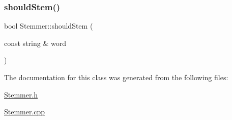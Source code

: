 \mbox{\label{class_stemmer_a7f617d3eda7515b21e88a7d585da0713}} 
\subsubsection{\texorpdfstring{should\+Stem()}{shouldStem()}}
{\footnotesize\ttfamily bool Stemmer\+::should\+Stem (\begin{DoxyParamCaption}\item[{const string \&}]{word }\end{DoxyParamCaption})}



The documentation for this class was generated from the following files\+:\begin{DoxyCompactItemize}
\item 
\hyperlink{_stemmer_8h}{Stemmer.\+h}\item 
\hyperlink{_stemmer_8cpp}{Stemmer.\+cpp}\end{DoxyCompactItemize}

